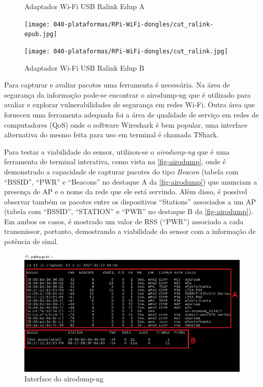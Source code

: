 \begin{figure}[htb]
	\begin{minipage}{0.45\textwidth}
		\centering
		\caption{Adaptador Wi-Fi USB Ralink Edup A\label{fig-ralink-edup}}
		\texttt{[image: 040-plataformas/RPi-WiFi-dongles/cut\_ralink-epub.jpg]}
	\end{minipage}
	\hfill
	\begin{minipage}{0.45\textwidth}
		\centering
		\caption{Adaptador Wi-Fi USB Ralink Edup B\label{fig-ralink}}
		\texttt{[image: 040-plataformas/RPi-WiFi-dongles/cut\_ralink.jpg]}
	\end{minipage}
\end{figure}


Para capturar e avaliar pacotes uma ferramenta é necessária. Na área de
segurança da informação pode-se encontrar o airodump-ng que é utilizado para
avaliar e explorar vulnerabilidades de segurança em redes Wi-Fi. Outra área que
forneceu uma ferramenta adequada foi a área de qualidade de serviço em redes de
computadores (QoS) onde o software Wireshark é bem popular, uma interface
alternativa do mesmo feita para uso em terminal é chamada TShark.

Para testar a viabilidade do sensor, utilizou-se o \emph{airodump-ng} que é uma
ferramenta de terminal interativa, como vista na \autoref{fig-airodump}, onde é
demonstrado a capacidade de capturar pacotes do tipo \emph{Beacon} (tabela com
``BSSID'', ``PWR'' e ``Beacons'' no destaque A da \autoref{fig-airodump}) que
anunciam a presença de AP e o nome da rede que ele está servindo. Além disso, é
possível observar também os pacotes entre os dispositivos ``Stations''
associados a um AP (tabela com ``BSSID'', ``STATION'' e ``PWR'' no destaque B da
\autoref{fig-airodump}). Em ambos os casos, é mostrado um valor de RSS (``PWR'')
associado a cada transmissor, portanto, demostrando a viabilidade do sensor com
a informação de potência de sinal.

\begin{figure}[htb]
	\caption{\label{fig-airodump}Interface do airodump-ng}
	\begin{center}
		\includegraphics[width=1\textwidth]{040-plataformas/RPi-WiFi-dongles/wifi-sniff-rpi/4-rpi-airodump.png}
	\end{center}
\end{figure}


